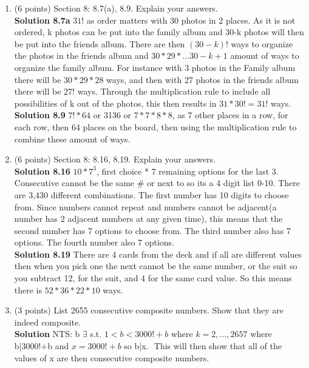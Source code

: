 \documentclass[12pt]{article}
\begin{document}
\begin{enumerate}
    \item (6 points) Section 8:  8.7(a), 8.9.  Explain your answers. \\ 
    \textbf{Solution 8.7a} $31!$ as order matters with 30 photos in 2 places. As it is not ordered, k photos can be put into the family album and 30-k photos will then be put into the friends album. There are then $(30-k)!$ ways to organize the photos in the friends album and $30*29*... 30-k+1$ amount of ways to organize the family album. For instance with 3 photos in the Family album there will be $30*29*28$ ways, and then with 27 photos in the friends album there will be 27! ways. Through the multiplication rule to include all possibilities of k out of the photos, this then results in $31*30! = 31!$ ways. \\
    
    \textbf{Solution 8.9} $7!*64$ or 3136 or $7*7*8*8$, as 7 other places in a row, for each row, then 64 places on the board, then using the multiplication rule to combine these amount of ways. \\
    
    
    \item (6 points) Section 8:   8.16, 8.19.  Explain your answers. \\ 
    \textbf{Solution 8.16}  $10*7^3$, first choice * 7 remaining options for the last 3. Consecutive cannot be the same # or next to so its a 4 digit list 0-10. There are 3,430 diﬀerent combinations. The ﬁrst number has 10 digits to choose from. Since numbers cannot repeat and numbers cannot be adjacent(a number has 2 adjacent numbers at any given time), this means that the second number has 7 options to choose from. The third number also has 7 options. The fourth number also 7 options. \\
    
    
    \textbf{Solution 8.19} There are 4 cards from the deck and if all are different values then when you pick one the next cannot be the same number, or the suit so you subtract 12, for the suit, and 4 for the same card value. So this means there is $52*36*22*10$ ways. 
    
    
    
    \item (3 points) List 2655 consecutive composite numbers.  Show that they are indeed composite.  \\
    
    \textbf{Solution} NTS: b $\exists$  s.t.  $1 < b < 3000! + b $ where  $ k = 2, ..., 2657 $ where  b|3000!+b and $x = 3000!+b $ so b|x. $ $ This will then show that all of the values of x are then consecutive composite numbers. \\
    

\end{enumerate}
\end{document}
